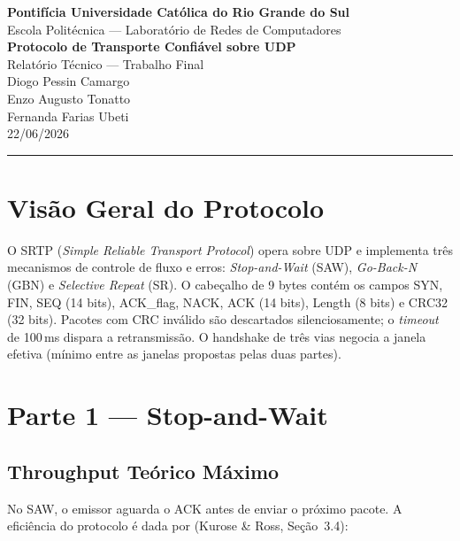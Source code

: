 \documentclass[10pt,a4paper]{article}
\begin{document}
\begin{center}
  {\large\textbf{Pontifícia Universidade Católica do Rio Grande do Sul}}\\[2pt]
  {\normalsize Escola Politécnica — Laboratório de Redes de Computadores}\\[10pt]
  {\LARGE\textbf{Protocolo de Transporte Confiável sobre UDP}}\\[4pt]
  {\large Relatório Técnico — Trabalho Final}\\[6pt]
  {\normalsize
    {Diogo Pessin Camargo} \\
    {Enzo Augusto Tonatto} \\
    {Fernanda Farias Ubeti}
  }\\[4pt]
  {\small{22/06/2026}}
\end{center}

\vspace{-4pt}
\hrule
\vspace{6pt}

\section{Visão Geral do Protocolo}

O SRTP (\textit{Simple Reliable Transport Protocol}) opera sobre UDP e implementa
três mecanismos de controle de fluxo e erros: \textit{Stop-and-Wait} (SAW),
\textit{Go-Back-N} (GBN) e \textit{Selective Repeat} (SR). O cabeçalho de 9 bytes
contém os campos SYN, FIN, SEQ (14 bits), ACK\_flag, NACK, ACK (14 bits),
Length (8 bits) e CRC32 (32 bits). Pacotes com CRC inválido são descartados
silenciosamente; o \textit{timeout} de 100\,ms dispara a retransmissão. O handshake
de três vias negocia a janela efetiva (mínimo entre as janelas propostas pelas
duas partes).

\section{Parte 1 — Stop-and-Wait}

\subsection{Throughput Teórico Máximo}

No SAW, o emissor aguarda o ACK antes de enviar o próximo pacote. A eficiência
do protocolo é dada por (Kurose \& Ross, Seção~3.4):
\end{document}
